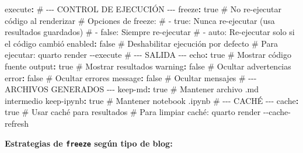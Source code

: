 \documentclass[
  doc,
  floatsintext,
  longtable,
  a4paper,
  nolmodern,
  notxfonts,
  notimes,
  12pt,
  colorlinks=true,linkcolor=blue,citecolor=blue,urlcolor=blue]{apa7}
\newenvironment{Shaded}{\begin{snugshade}}{\end{snugshade}}
\newcommand{\AttributeTok}[1]{\textcolor[rgb]{0.40,0.45,0.13}{#1}}
\newcommand{\CharTok}[1]{\textcolor[rgb]{0.13,0.47,0.30}{#1}}
\newcommand{\CommentTok}[1]{\textcolor[rgb]{0.37,0.37,0.37}{#1}}
\newcommand{\FunctionTok}[1]{\textcolor[rgb]{0.28,0.35,0.67}{#1}}
\newcommand{\KeywordTok}[1]{\textcolor[rgb]{0.00,0.23,0.31}{\textbf{#1}}}
\begin{document}
\begin{Shaded}
\begin{Highlighting}[]
\FunctionTok{execute}\KeywordTok{:}
\CommentTok{  \# {-}{-}{-} CONTROL DE EJECUCIÓN {-}{-}{-}}
\AttributeTok{  }\FunctionTok{freeze}\KeywordTok{:}\AttributeTok{ }\CharTok{true}\CommentTok{                    \# No re{-}ejecutar código al renderizar}
\CommentTok{  \# Opciones de freeze:}
\CommentTok{  \# {-} true: Nunca re{-}ejecutar (usa resultados guardados)}
\CommentTok{  \# {-} false: Siempre re{-}ejecutar}
\CommentTok{  \# {-} auto: Re{-}ejecutar solo si el código cambió}
\AttributeTok{  }
\AttributeTok{  }\FunctionTok{enabled}\KeywordTok{:}\AttributeTok{ }\CharTok{false}\CommentTok{                  \# Deshabilitar ejecución por defecto}
\CommentTok{  \# Para ejecutar: quarto render {-}{-}execute}
\AttributeTok{  }
\CommentTok{  \# {-}{-}{-} SALIDA {-}{-}{-}}
\AttributeTok{  }\FunctionTok{echo}\KeywordTok{:}\AttributeTok{ }\CharTok{true}\CommentTok{                      \# Mostrar código fuente}
\AttributeTok{  }\FunctionTok{output}\KeywordTok{:}\AttributeTok{ }\CharTok{true}\CommentTok{                    \# Mostrar resultados}
\AttributeTok{  }\FunctionTok{warning}\KeywordTok{:}\AttributeTok{ }\CharTok{false}\CommentTok{                  \# Ocultar advertencias}
\AttributeTok{  }\FunctionTok{error}\KeywordTok{:}\AttributeTok{ }\CharTok{false}\CommentTok{                    \# Ocultar errores}
\AttributeTok{  }\FunctionTok{message}\KeywordTok{:}\AttributeTok{ }\CharTok{false}\CommentTok{                  \# Ocultar mensajes}
\AttributeTok{  }
\CommentTok{  \# {-}{-}{-} ARCHIVOS GENERADOS {-}{-}{-}}
\AttributeTok{  }\FunctionTok{keep{-}md}\KeywordTok{:}\AttributeTok{ }\CharTok{true}\CommentTok{                   \# Mantener archivo .md intermedio}
\AttributeTok{  }\FunctionTok{keep{-}ipynb}\KeywordTok{:}\AttributeTok{ }\CharTok{true}\CommentTok{                \# Mantener notebook .ipynb}
\AttributeTok{  }
\CommentTok{  \# {-}{-}{-} CACHÉ {-}{-}{-}}
\AttributeTok{  }\FunctionTok{cache}\KeywordTok{:}\AttributeTok{ }\CharTok{true}\CommentTok{                     \# Usar caché para resultados}
\CommentTok{  \# Para limpiar caché: quarto render {-}{-}cache{-}refresh}
\end{Highlighting}
\end{Shaded}

\textbf{Estrategias de \texttt{freeze} según tipo de blog:}
\end{document}
